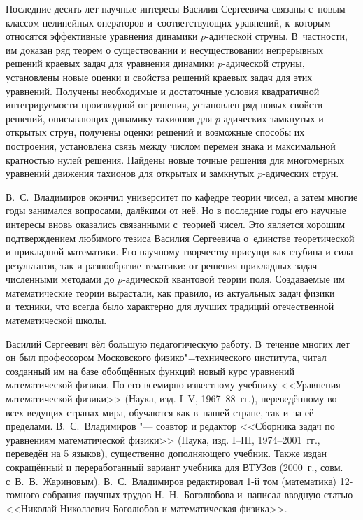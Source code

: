 Последние десять лет научные интересы Василия Сергеевича связаны с~новым классом нелинейных операторов и~соответствующих уравнений, к~которым относятся эффективные уравнения динамики $p$-адической струны. \linebreak
В~частности, им доказан ряд теорем о существовании и несуществовании непрерывных решений краевых задач для уравнения динамики $p$-адической струны, установлены новые оценки и свойства решений
краевых задач для этих уравнений. Получены необходимые и достаточные условия квадратичной интегрируемости производной от решения, установлен ряд новых свойств решений, описывающих динамику тахионов для $p$-адических замкнутых и открытых струн, получены оценки решений и возможные способы их построения, установлена связь между числом перемен знака и максимальной кратностью нулей решения.
Найдены новые точные решения для многомерных уравнений движения тахионов для открытых и замкнутых $p$-адических струн.


В.~С.~Владимиров окончил университет по кафедре теории чисел, а затем многие годы занимался вопросами, далёкими от неё. Но в последние годы его научные интересы вновь оказались связанными с~теорией чисел. Это является хорошим подтверждением любимого тезиса Василия Сергеевича о~единстве теоретической и прикладной математики. 
Его научному творчеству присущи как глубина и сила результатов, так и разнообразие тематики: от решения прикладных задач численными методами до $p$-адической квантовой теории поля. 
Создаваемые им математические теории вырастали, как правило, из актуальных задач физики и~техники,
что всегда было характерно для лучших традиций отечественной математической школы.


Василий Сергеевич вёл большую педагогическую работу. 
В~течение многих лет он был профессором Московского физико"=технического института, читал созданный им на базе обобщённых функций новый курс уравнений математической физики. 
По его всемирно известному учебнику <<Уравнения математической физики>> (Наука, изд. I--V, 1967--88~гг.), переведённому во всех ведущих странах мира, обучаются как в~нашей стране, так и~за её пределами. 
В.~С.~Владимиров "--- соавтор и редактор <<Сборника задач по уравнениям математической физики>> (Наука, изд. I--III, 1974--2001~гг., переведён на 5 языков), существенно дополняющего учебник. 
Также издан сокращённый и переработанный вариант учебника для ВТУЗов (2000~г., совм. с~В.~В.~Жариновым). В.~С.~Владимиров редактировал 1-й том (математика) 12-томного собрания научных трудов Н.~Н.~Боголюбова и~написал вводную статью <<Николай Николаевич Боголюбов и математическая физика>>.


